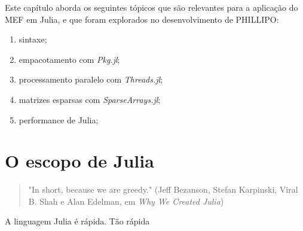 Este capítulo aborda os seguintes tópicos  que são relevantes para a aplicação do MEF em Julia, e que foram explorados no desenvolvimento de PHILLIPO:

\begin{enumerate}
    \item sintaxe;
    \item empacotamento com \emph{Pkg.jl};
    \item processamento paralelo com \emph{Threads.jl};
    \item matrizes esparsas com \emph{SparseArrays.jl};
    \item performance de Julia;
\end{enumerate}

\section{O escopo de Julia}

\begin{quotation}
    "In short, because we are greedy."
    (Jeff Bezanson, Stefan Karpinski, Viral B. Shah e Alan Edelman, em \emph{Why We Created Julia})
\end{quotation}

A linguagem Julia é rápida. Tão rápida \cite{julia}